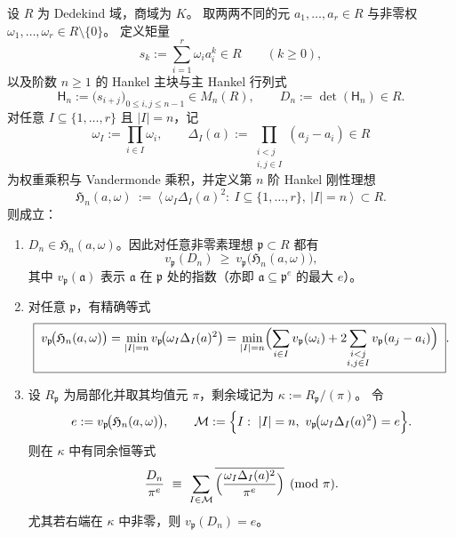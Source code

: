 \begin{conclusion}\label{con:xi-terminal-hankel-rigidity-ideal-nonarchimedean}
设 \(R\) 为 Dedekind 域，商域为 \(K\)。
取两两不同的元 \(a_1,\dots,a_r\in R\) 与非零权 \(\omega_1,\dots,\omega_r\in R\setminus\{0\}\)。
定义矩量
\[
s_k:=\sum_{i=1}^{r}\omega_i a_i^k\in R\qquad(k\ge 0),
\]
以及阶数 \(n\ge 1\) 的 Hankel 主块与主 Hankel 行列式
\[
\mathsf H_n:=\bigl(s_{i+j}\bigr)_{0\le i,j\le n-1}\in M_n(R),\qquad
D_n:=\det(\mathsf H_n)\in R.
\]
对任意 \(I\subseteq\{1,\dots,r\}\) 且 \(|I|=n\)，记
\[
\omega_I:=\prod_{i\in I}\omega_i,\qquad
\Delta_I(a):=\prod_{\substack{i<j\\ i,j\in I}}(a_j-a_i)\in R
\]
为权重乘积与 Vandermonde 乘积，并定义第 \(n\) 阶 Hankel 刚性理想
\[
\mathfrak H_n(a,\omega)\ :=\ \big\langle\ \omega_I\Delta_I(a)^2:\ I\subseteq\{1,\dots,r\},\ |I|=n\ \big\rangle\ \subset R.
\]
则成立：
\begin{enumerate}
  \item \(D_n\in\mathfrak H_n(a,\omega)\)。因此对任意非零素理想 \(\mathfrak p\subset R\) 都有
  \[
  v_{\mathfrak p}(D_n)\ \ge\ v_{\mathfrak p}\!\bigl(\mathfrak H_n(a,\omega)\bigr),
  \]
  其中 \(v_{\mathfrak p}(\mathfrak a)\) 表示 \(\mathfrak a\) 在 \(\mathfrak p\) 处的指数（亦即 \(\mathfrak a\subseteq \mathfrak p^{e}\) 的最大 \(e\)）。
  \item 对任意 \(\mathfrak p\)，有精确等式
  \[
  \boxed{\;
  v_{\mathfrak p}\!\bigl(\mathfrak H_n(a,\omega)\bigr)
  =\min_{|I|=n} v_{\mathfrak p}\!\bigl(\omega_I\Delta_I(a)^2\bigr)
  =\min_{|I|=n}\Bigl(\sum_{i\in I}v_{\mathfrak p}(\omega_i)+2\!\sum_{\substack{i<j\\ i,j\in I}}v_{\mathfrak p}(a_j-a_i)\Bigr)\; }.
  \]
  \item 设 \(R_{\mathfrak p}\) 为局部化并取其均值元 \(\pi\)，剩余域记为 \(\kappa:=R_{\mathfrak p}/(\pi)\)。
  令
  \[
  e:=v_{\mathfrak p}\!\bigl(\mathfrak H_n(a,\omega)\bigr),\qquad
  \mathcal M:=\Bigl\{I:\ |I|=n,\ v_{\mathfrak p}\!\bigl(\omega_I\Delta_I(a)^2\bigr)=e\Bigr\}.
  \]
  则在 \(\kappa\) 中有同余恒等式
  \[
  \frac{D_n}{\pi^e}\ \equiv\ \sum_{I\in\mathcal M} \overline{\Bigl(\frac{\omega_I\Delta_I(a)^2}{\pi^e}\Bigr)}\pmod{\pi}.
  \]
  尤其若右端在 \(\kappa\) 中非零，则 \(v_{\mathfrak p}(D_n)=e\)。
\end{enumerate}
\end{conclusion}
